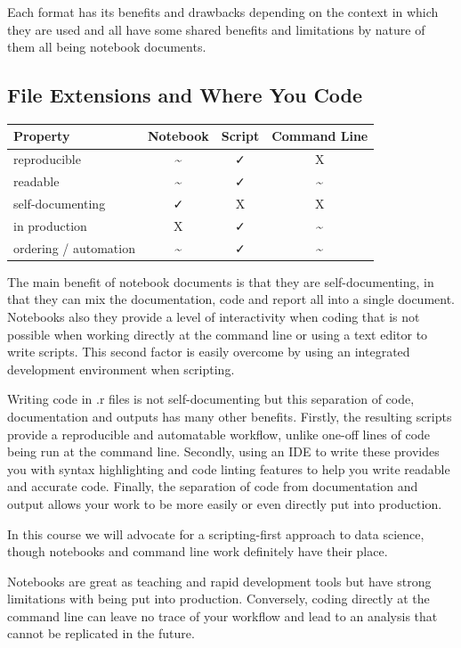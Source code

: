 \documentclass[
  12pt,
]{book}
\begin{document}
Each format has its benefits and drawbacks depending on the context in which they are used and all have some shared benefits and limitations by nature of them all being notebook documents.

\hypertarget{file-extensions-and-where-you-code}{%
\subsection{File Extensions and Where You Code}\label{file-extensions-and-where-you-code}}

\begin{longtable}[]{@{}lccc@{}}
\toprule()
Property & Notebook & Script & Command Line \\
\midrule()
\endhead
reproducible & \textasciitilde{} & ✓ & X \\
readable & \textasciitilde{} & ✓ & \textasciitilde{} \\
self-documenting & ✓ & X & X \\
in production & X & ✓ & \textasciitilde{} \\
ordering / automation & \textasciitilde{} & ✓ & \textasciitilde{} \\
\bottomrule()
\end{longtable}

The main benefit of notebook documents is that they are self-documenting, in that they can mix the documentation, code and report all into a single document. Notebooks also they provide a level of interactivity when coding that is not possible when working directly at the command line or using a text editor to write scripts. This second factor is easily overcome by using an integrated development environment when scripting.

Writing code in .r files is not self-documenting but this separation of code, documentation and outputs has many other benefits. Firstly, the resulting scripts provide a reproducible and automatable workflow, unlike one-off lines of code being run at the command line. Secondly, using an IDE to write these provides you with syntax highlighting and code linting features to help you write readable and accurate code. Finally, the separation of code from documentation and output allows your work to be more easily or even directly put into production.

In this course we will advocate for a scripting-first approach to data science, though notebooks and command line work definitely have their place.

Notebooks are great as teaching and rapid development tools but have strong limitations with being put into production. Conversely, coding directly at the command line can leave no trace of your workflow and lead to an analysis that cannot be replicated in the future.
\end{document}
